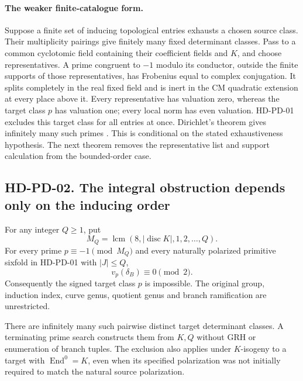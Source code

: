 \paragraph{The weaker finite-catalogue form.}
Suppose a finite set of inducing topological entries exhausts a
chosen source class.  Their multiplicity pairings give finitely
many fixed determinant classes.  Pass to a common cyclotomic
field containing their coefficient fields and $K$, and choose
representatives.  A prime congruent to $-1$ modulo its conductor,
outside the finite supports of those representatives, has
Frobenius equal to complex conjugation.  It splits completely
in the real fixed field and is inert in the CM quadratic
extension at every place above it.  Every representative has
valuation zero, whereas the target class $p$ has valuation one;
every local norm has even valuation.  HD-PD-01 excludes this
target class for all entries at once.  Dirichlet's theorem gives
infinitely many such primes \cite[Section 1, p.~63]{PD:Harrison2009}.
This is conditional on the stated exhaustiveness hypothesis.
The next theorem removes the representative list and support
calculation from the bounded-order case.

\subsection*{HD-PD-02. The integral obstruction depends only on the inducing order}

\begin{theorem}[HD-PD-02]
For any integer $Q\ge1$, put
\[
            M_Q=\operatorname{lcm}(8,|\operatorname{disc}K|,
                                      1,2,\ldots,Q).
 \tag{PD.8}
\]
For every prime $p\equiv-1\pmod {M_Q}$ and every naturally
polarized primitive sixfold in HD-PD-01 with $|J|\le Q$,
\[
                             v_p(\delta_B)\equiv0\pmod2.
 \tag{PD.9}
\]
Consequently the signed target class $p$ is impossible.
The original group, induction index, curve genus, quotient
genus and branch ramification are unrestricted.

There are infinitely many such pairwise distinct target
determinant classes.  A terminating prime search constructs
them from $K,Q$ without GRH or enumeration of branch tuples.
The exclusion also applies under $K$-isogeny to a target with
$\operatorname{End}^0=K$, even when its specified polarization
was not initially required to match the natural source polarization.
\end{theorem}

